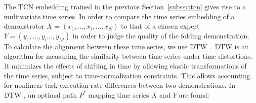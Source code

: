 \documentclass[\home/main.tex]{subfiles}
\begin{document}
The TCN embedding trained in the previous Section~\ref{subsec:tcn} gives rise to a multivariate time series. In order to compare the time series embedding of a demonstrator $X = (x_1, \ldots, x_i, \ldots, x_N)$ to that of a chosen expert $Y = (y_1, \ldots, y_i \ldots, y_M)$ in order to judge the quality of the folding demonstration. To calculate the alignment between these time series, we use \acrfull{DTW}~\cite{Bellman1959}. \acrshort{DTW} is an algorithm for measuring the similarity between time series under time distortions. It minimizes the effects of shifting in time by allowing elastic transformations of the time series, subject to time-normalization constraints. This allows accounting for nonlinear task execution rate differences between two demonstrations. In \acrshort{DTW} , an optimal path $P^*$ mapping time series $X$ and $Y$ are found:

\end{document}

